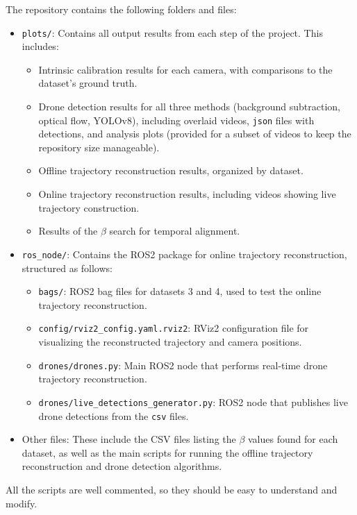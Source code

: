 \documentclass[11pt]{article}
\begin{document}
The repository contains the following folders and files:
\begin{itemize}
    \item \texttt{plots/}: Contains all output results from each step of the project. This includes:
          \begin{itemize}
              \item Intrinsic calibration results for each camera, with comparisons to the dataset's ground truth.
              \item Drone detection results for all three methods (background subtraction, optical flow, YOLOv8), including overlaid videos, \texttt{json} files with detections, and analysis plots (provided for a subset of videos to keep the repository size manageable).
              \item Offline trajectory reconstruction results, organized by dataset.
              \item Online trajectory reconstruction results, including videos showing live trajectory construction.
              \item Results of the $\beta$ search for temporal alignment.
          \end{itemize}
    \item \texttt{ros\_node/}: Contains the ROS2 package for online trajectory reconstruction, structured as follows:
          \begin{itemize}
              \item \texttt{bags/}: ROS2 bag files for datasets 3 and 4, used to test the online trajectory reconstruction.
              \item \texttt{config/rviz2\_config.yaml.rviz2}: RViz2 configuration file for visualizing the reconstructed trajectory and camera positions.
              \item \texttt{drones/drones.py}: Main ROS2 node that performs real-time drone trajectory reconstruction.
              \item \texttt{drones/live\_detections\_generator.py}: ROS2 node that publishes live drone detections from the \texttt{csv} files.
          \end{itemize}
    \item Other files: These include the CSV files listing the $\beta$ values found for each dataset, as well as the main scripts for running the offline trajectory reconstruction and drone detection algorithms.
\end{itemize}

All the scripts are well commented, so they should be easy to understand and modify.
\end{document}
